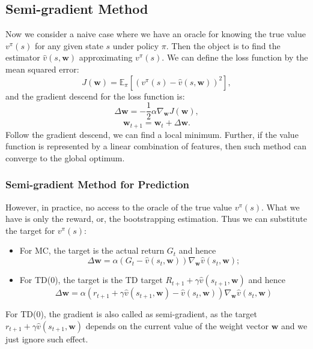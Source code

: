 \documentclass{progartcn}
\begin{document}
	\subsection{Semi-gradient Method}

			Now we consider a naive case where we have an oracle for knowing the true value $v^\pi(s)$ for any given state $s$ under policy $\pi$. Then the object is to find the estimator $\hat{v}(s,\bm{w})$ approximating $v^\pi(s)$. We can define the loss function by the mean squared error:
			\[J(\bm{w})=\mathbb{E}_\pi[(v^\pi(s)-\hat v(s,\bm{w}))^2],\]
			and the gradient descend for the loss function is:
			\[\Delta\bm{w}=-\frac{1}{2}\alpha \nabla_{\bm{w}} J(\bm{w}),\]
			\[\bm{w}_{t+1}=\bm{w}_t+\Delta\bm{w}.\]
			Follow the gradient descend, we can find a local minimum. Further, if the value function is represented by a linear combination of features, then such method can converge to the global optimum.\\

			\subsubsection{Semi-gradient Method for Prediction} %

				However, in practice, no access to the oracle of the true value $v^\pi(s)$. What we have is only the reward, or, the bootstrapping estimation. Thus we can substitute the target for $v^\pi(s)$:
				\begin{itemize}[noitemsep,topsep=0pt]
					\item For MC, the target is the actual return $G_t$ and hence
					\[\Delta \bm{w}=\alpha(G_t-\hat{v}(s_t,\bm{w}))\nabla_{\bm{w}} \hat{v}(s_t,\bm{w});\]
					\item For TD(0), the target is the TD target $R_{t+1}+\gamma\hat{v}(s_{t+1},\bm{w})$ and hence
					\[\Delta \bm{w}=\alpha(r_{t+1}+\gamma\hat{v}(s_{t+1},\bm{w})-\hat{v}(s_t,\bm{w}))\nabla_{\bm{w}} \hat{v}(s_t,\bm{w})\]
				\end{itemize}

				For TD(0), the gradient is also called as semi-gradient, as the target $r_{t+1}+\gamma\hat{v}(s_{t+1},\bm{w})$ depends on the current value of the weight vector $\bm{w}$ and we just ignore such effect.
\end{document}
